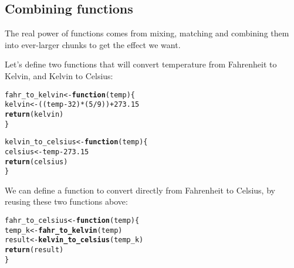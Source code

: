 \documentclass[12pt,a4paper]{scrartcl}\usepackage[]{graphicx}\usepackage[]{color}
\makeatletter
\newcommand{\hlnum}[1]{\textcolor[rgb]{0.686,0.059,0.569}{#1}}%
\newcommand{\hlopt}[1]{\textcolor[rgb]{0,0,0}{#1}}%
\newcommand{\hlstd}[1]{\textcolor[rgb]{0.345,0.345,0.345}{#1}}%
\newcommand{\hlkwa}[1]{\textcolor[rgb]{0.161,0.373,0.58}{\textbf{#1}}}%
\newcommand{\hlkwb}[1]{\textcolor[rgb]{0.69,0.353,0.396}{#1}}%
\newcommand{\hlkwc}[1]{\textcolor[rgb]{0.333,0.667,0.333}{#1}}%
\newcommand{\hlkwd}[1]{\textcolor[rgb]{0.737,0.353,0.396}{\textbf{#1}}}%
\newenvironment{kframe}{%
 \def\at@end@of@kframe{}%
 \ifinner\ifhmode%
  \def\at@end@of@kframe{\end{minipage}}%
  \begin{minipage}{\columnwidth}%
 \fi\fi%
 \def\FrameCommand##1{\hskip\@totalleftmargin \hskip-\fboxsep
 \colorbox{shadecolor}{##1}\hskip-\fboxsep
     \hskip-\linewidth \hskip-\@totalleftmargin \hskip\columnwidth}%
 \MakeFramed {\advance\hsize-\width
   \@totalleftmargin\z@ \linewidth\hsize
   \@setminipage}}%
 {\par\unskip\endMakeFramed%
 \at@end@of@kframe}
\newenvironment{knitrout}{}{} %
\makeatother
\begin{document}
\subsection{Combining functions}

The real power of functions comes from mixing, matching and combining them into ever-larger chunks to get the effect we want.

Let’s define two functions that will convert temperature from Fahrenheit to Kelvin, and Kelvin to Celsius:

\begin{knitrout}
\color{fgcolor}\begin{kframe}
\begin{alltt}
\hlstd{fahr_to_kelvin} \hlkwb{<-} \hlkwa{function}\hlstd{(}\hlkwc{temp}\hlstd{) \{}
  \hlstd{kelvin} \hlkwb{<-} \hlstd{((temp} \hlopt{-} \hlnum{32}\hlstd{)} \hlopt{*} \hlstd{(}\hlnum{5} \hlopt{/} \hlnum{9}\hlstd{))} \hlopt{+} \hlnum{273.15}
  \hlkwd{return}\hlstd{(kelvin)}
\hlstd{\}}

\hlstd{kelvin_to_celsius} \hlkwb{<-} \hlkwa{function}\hlstd{(}\hlkwc{temp}\hlstd{) \{}
  \hlstd{celsius} \hlkwb{<-} \hlstd{temp} \hlopt{-} \hlnum{273.15}
  \hlkwd{return}\hlstd{(celsius)}
\hlstd{\}}
\end{alltt}
\end{kframe}
\end{knitrout}

We can define a function to convert directly from Fahrenheit to Celsius, by reusing these two functions above:

\begin{knitrout}
\color{fgcolor}\begin{kframe}
\begin{alltt}
\hlstd{fahr_to_celsius} \hlkwb{<-} \hlkwa{function}\hlstd{(}\hlkwc{temp}\hlstd{) \{}
  \hlstd{temp_k} \hlkwb{<-} \hlkwd{fahr_to_kelvin}\hlstd{(temp)}
  \hlstd{result} \hlkwb{<-} \hlkwd{kelvin_to_celsius}\hlstd{(temp_k)}
  \hlkwd{return}\hlstd{(result)}
\hlstd{\}}
\end{alltt}
\end{kframe}
\end{knitrout}
\end{document}

